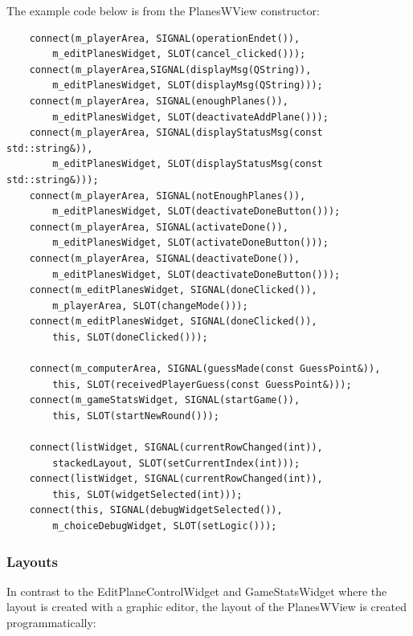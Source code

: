 The example code below is from the PlanesWView constructor:

\begin{lstlisting}
    connect(m_playerArea, SIGNAL(operationEndet()),
		m_editPlanesWidget, SLOT(cancel_clicked()));
	connect(m_playerArea,SIGNAL(displayMsg(QString)),
		m_editPlanesWidget, SLOT(displayMsg(QString)));
	connect(m_playerArea, SIGNAL(enoughPlanes()),
		m_editPlanesWidget, SLOT(deactivateAddPlane()));
	connect(m_playerArea, SIGNAL(displayStatusMsg(const std::string&)),
		m_editPlanesWidget, SLOT(displayStatusMsg(const std::string&)));
	connect(m_playerArea, SIGNAL(notEnoughPlanes()),
		m_editPlanesWidget, SLOT(deactivateDoneButton()));
	connect(m_playerArea, SIGNAL(activateDone()),
		m_editPlanesWidget, SLOT(activateDoneButton()));
	connect(m_playerArea, SIGNAL(deactivateDone()),
		m_editPlanesWidget, SLOT(deactivateDoneButton()));
	connect(m_editPlanesWidget, SIGNAL(doneClicked()),
		m_playerArea, SLOT(changeMode()));
	connect(m_editPlanesWidget, SIGNAL(doneClicked()),
		this, SLOT(doneClicked()));

	connect(m_computerArea, SIGNAL(guessMade(const GuessPoint&)),
		this, SLOT(receivedPlayerGuess(const GuessPoint&)));
	connect(m_gameStatsWidget, SIGNAL(startGame()),
		this, SLOT(startNewRound()));
	
	connect(listWidget, SIGNAL(currentRowChanged(int)),
		stackedLayout, SLOT(setCurrentIndex(int)));
	connect(listWidget, SIGNAL(currentRowChanged(int)),
		this, SLOT(widgetSelected(int)));
	connect(this, SIGNAL(debugWidgetSelected()),
		m_choiceDebugWidget, SLOT(setLogic()));
\end{lstlisting}

\subsubsection{Layouts}

In contrast to the EditPlaneControlWidget and GameStatsWidget where the layout is created with a graphic editor, the layout of the PlanesWView is created programmatically:

